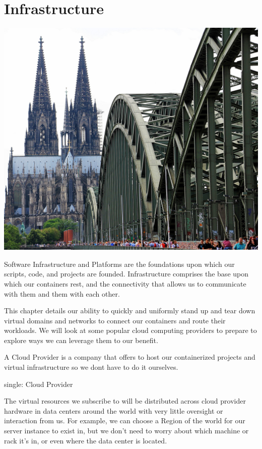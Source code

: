 \makeatletter
{}
\renewcommand{\thefigure}{\thechapter.\@arabic\c@figure}
\makeatother

\hypertarget{infrastructure}{%
\section{Infrastructure}\label{infrastructure}}

\includegraphics{../images/cologne-cathedral-1507854_1920.jpg}

Software Infrastructure and Platforms are the foundations upon which our
scripts, code, and projects are founded. Infrastructure comprises the
base upon which our containers rest, and the connectivity that allows us
to communicate with them and them with each other.

This chapter details our ability to quickly and uniformly stand up and
tear down virtual domains and networks to connect our containers and
route their workloads. We will look at some popular cloud computing
providers to prepare to explore ways we can leverage them to our
benefit.

A Cloud Provider is a company that offers to host our containerized
projects and virtual infrastructure so we dont have to do it ourselves.

single: Cloud Provider

The virtual resources we subscribe to will be distributed across cloud
provider hardware in data centers around the world with very little
oversight or interaction from us. For example, we can choose a Region of
the world for our server instance to exist in, but we don't need to
worry about which machine or rack it's in, or even where the data center
is located.

